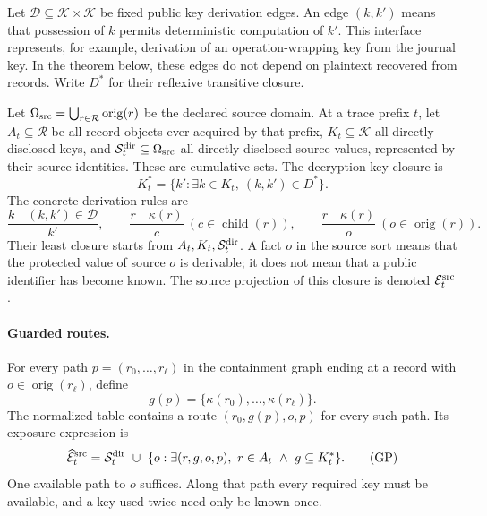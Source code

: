 \documentclass[pdflatex]{sn-jnl}
\theoremstyle{thmstyleone}
\theoremstyle{thmstylethree}
\theoremstyle{thmstyletwo}
\begin{document}
Let $\mathcal D\subseteq\mathcal K\times\mathcal K$ be fixed public key
derivation edges.  An edge $(k,k')$ means that possession of $k$ permits
deterministic computation of $k'$.  This interface represents, for example,
derivation of an operation-wrapping key from the journal key.  In the
theorem below, these edges do not depend on plaintext recovered from records.
Write $D^*$ for their reflexive transitive closure.

Let $\Omega_{\rm src}=\bigcup_{r\in\mathcal R}\operatorname{orig}(r)$ be the
declared source domain.  At a trace prefix $t$, let $A_t\subseteq\mathcal R$ be all record objects
ever acquired by that prefix, $K_t\subseteq\mathcal K$ all directly
disclosed keys, and $\mathcal S^{\rm dir}_t\subseteq\Omega_{\rm src}$ all directly disclosed source values, represented
by their source identities.  These are cumulative sets.  The decryption-key
closure is
\[
  K_t^*=\{k':\exists k\in K_t,\ (k,k')\in D^*\}.
\]
The concrete derivation rules are
\[
 \frac{k\quad(k,k')\in\mathcal D}{k'},\qquad
 \frac{r\quad\kappa(r)}{c}\ (c\in\operatorname{child}(r)),\qquad
 \frac{r\quad\kappa(r)}{o}\ (o\in\operatorname{orig}(r)).
\]
Their least closure starts from $A_t,K_t,\mathcal S^{\rm dir}_t$.  A fact $o$ in the source
sort means that the protected value of source $o$ is derivable; it does
not mean that a public identifier has become known.  The source projection
of this closure is denoted $\mathcal E^{\rm src}_t$.

\paragraph{Guarded routes.}
For every path $p=(r_0,\ldots,r_\ell)$ in the containment graph ending
at a record with $o\in\operatorname{orig}(r_\ell)$, define
\[
 g(p)=\{\kappa(r_0),\ldots,\kappa(r_\ell)\}.
\]
The normalized table contains a route $(r_0,g(p),o,p)$ for every such
path.  Its exposure expression is
\[
 \widehat{\mathcal E}^{\rm src}_t=\mathcal S^{\rm dir}_t\ \cup\
 \{o:\exists(r,g,o,p),\ r\in A_t\ \land\ g\subseteq K_t^*\}.
 \tag{GP}
\]
One available path to $o$ suffices. Along that path every required
key must be available, and a key used twice need only be known once.
\end{document}
